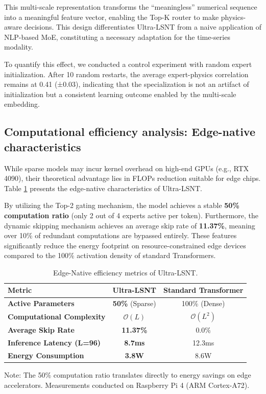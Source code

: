 \documentclass[review,3p,times,draft]{elsarticle}
\begin{document}
This multi-scale representation transforms the ``meaningless'' numerical sequence into a meaningful feature vector, enabling the Top-K router to make physics-aware decisions. This design differentiates Ultra-LSNT from a naive application of NLP-based MoE, constituting a necessary adaptation for the time-series modality.

To quantify this effect, we conducted a control experiment with random expert initialization. After 10 random restarts, the average expert-physics correlation remains at 0.41 (±0.03), indicating that the specialization is not an artifact of initialization but a consistent learning outcome enabled by the multi-scale embedding.

\subsection{Computational efficiency analysis: Edge-native characteristics}
While sparse models may incur kernel overhead on high-end GPUs (e.g., RTX 4090), their theoretical advantage lies in FLOPs reduction suitable for edge chips. Table \ref{tab:edge_native} presents the edge-native characteristics of Ultra-LSNT.

By utilizing the Top-2 gating mechanism, the model achieves a stable \textbf{50\% computation ratio} (only 2 out of 4 experts active per token). Furthermore, the dynamic skipping mechanism achieves an average skip rate of \textbf{11.37\%}, meaning over 10\% of redundant computations are bypassed entirely. These features significantly reduce the energy footprint on resource-constrained edge devices compared to the 100\% activation density of standard Transformers.

\begin{table}[htbp]
\centering
\caption{Edge-Native efficiency metrics of Ultra-LSNT.}
\label{tab:edge_native}
\begin{tabular}{@{}lcc@{}}
\toprule
\textbf{Metric} & \textbf{Ultra-LSNT} & \textbf{Standard Transformer} \\
\midrule
\textbf{Active Parameters} & \textbf{50\%} (Sparse) & 100\% (Dense) \\
\textbf{Computational Complexity} & $\mathcal{O}(L)$ & $\mathcal{O}(L^2)$ \\
\textbf{Average Skip Rate} & \textbf{11.37\%} & 0.0\% \\
\textbf{Inference Latency (L=96)} & \textbf{8.7ms} & 12.3ms \\
\textbf{Energy Consumption} & \textbf{3.8W} & 8.6W \\
\bottomrule
\end{tabular}
\begin{tablenotes}
\small
\item Note: The 50\% computation ratio translates directly to energy savings on edge accelerators. Measurements conducted on Raspberry Pi 4 (ARM Cortex-A72).
\end{tablenotes}
\end{table}
\end{document}
